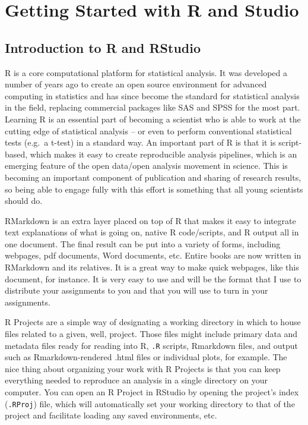 \documentclass[
]{book}
\begin{document}
\hypertarget{getting-started-with-r-and-studio}{%
\chapter{Getting Started with R and Studio}\label{getting-started-with-r-and-studio}}

\hypertarget{introduction-to-r-and-rstudio}{%
\section{Introduction to R and RStudio}\label{introduction-to-r-and-rstudio}}

R is a core computational platform for statistical analysis. It was developed a number of years ago to create an open source environment for advanced computing in statistics and has since become the standard for statistical analysis in the field, replacing commercial packages like SAS and SPSS for the most part. Learning R is an essential part of becoming a scientist who is able to work at the cutting edge of statistical analysis -- or even to perform conventional statistical tests (e.g.~a t-test) in a standard way. An important part of R is that it is script-based, which makes it easy to create reproducible analysis pipelines, which is an emerging feature of the open data/open analysis movement in science. This is becoming an important component of publication and sharing of research results, so being able to engage fully with this effort is something that all young scientists should do.

RMarkdown is an extra layer placed on top of R that makes it easy to integrate text explanations of what is going on, native R code/scripts, and R output all in one document. The final result can be put into a variety of forms, including webpages, pdf documents, Word documents, etc. Entire books are now written in RMarkdown and its relatives. It is a great way to make quick webpages, like this document, for instance. It is very easy to use and will be the format that I use to distribute your assignments to you and that you will use to turn in your assignments.

R Projects are a simple way of designating a working directory in which to house files related to a given, well, project. Those files might include primary data and metadata files ready for reading into R, \texttt{.R} scripts, Rmarkdown files, and output such as Rmarkdown-rendered .html files or individual plots, for example. The nice thing about organizing your work with R Projects is that you can keep everything needed to reproduce an analysis in a single directory on your computer. You can open an R Project in RStudio by opening the project's index (\texttt{.RProj}) file, which will automatically set your working directory to that of the project and facilitate loading any saved environments, etc.
\end{document}

